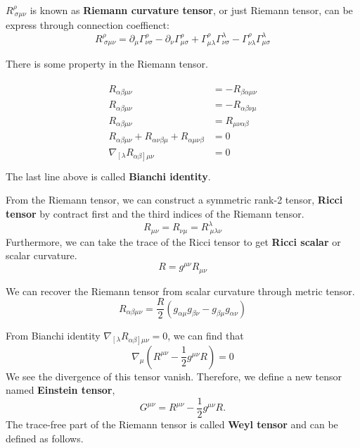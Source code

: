 \documentclass[12pt]{article}
\theoremstyle{mystyle}{\newtheorem{definition}{Definition}[subsection]}
\theoremstyle{mystyle}{\newtheorem{theorem}[definition]{Theorem}}
\theoremstyle{mystyle}{\newtheorem*{remark}{Remark}}
\theoremstyle{mystyle}{\newtheorem{example}{Example}[subsection]}
\theoremstyle{mystyle}{\newtheorem{examples}{Examples}[subsection]}
\theoremstyle{mystyle}{\newtheorem{cthm}{}[subsection]}
\begin{document}
\begin{definition}
  \(R^{\rho}_{\ \sigma\mu\nu}\) is known as \textbf{Riemann curvature tensor}, or just Riemann tensor,
  can be express through connection coeffienct: \[R^{\rho}_{\ \sigma\mu\nu} =
    \partial_{\mu} \Gamma^{\rho}_{\nu\sigma} -
    \partial_{\nu} \Gamma^{\rho}_{\mu\sigma} +
    \Gamma^{\rho}_{\mu\lambda}\Gamma^{\lambda}_{\nu\sigma} -
    \Gamma^{\rho}_{\nu\lambda}\Gamma^{\lambda}_{\mu\sigma}
  \]
\end{definition}
There is some property in the Riemann tensor.

\begin{cthm}
  \begin{align*}
    \begin{split}
      R_{\alpha\beta\mu\nu} &= -R_{\beta\alpha\mu\nu}\\
      R_{\alpha\beta\mu\nu} &= -R_{\alpha\beta\nu\mu}\\
      R_{\alpha\beta\mu\nu} &= R_{\mu\nu\alpha\beta}\\
      R_{\alpha\beta\mu\nu} + R_{\alpha\nu\beta\mu} + R_{\alpha\mu\nu\beta} &= 0 \\
      \nabla_{\left[ \lambda \right.} R_{\left.\alpha\beta \right] \mu\nu} &= 0 \\
    \end{split}
  \end{align*}
  The last line above is called \textbf{Bianchi identity}.
\end{cthm}

\begin{definition}
  From the Riemann tensor, we can construct a symmetric rank-2 tensor, \textbf{Ricci tensor}
  by contract first and the third indices of the Riemann tensor.
  \[R_{\mu\nu} = R_{\nu\mu} = R^{\lambda}_{\ \mu\lambda\nu}\]
  Furthermore, we can take the trace of the Ricci tensor to get \textbf{Ricci scalar} or scalar curvature.
  \[R = g^{\mu\nu}R_{\mu\nu}\]
\end{definition}

We can recover the Riemann tensor from scalar curvature through metric tensor.
\[R_{\alpha\beta\mu\nu} = \frac{R}{2}(g_{\alpha\mu}g_{\beta\nu}-g_{\beta\mu}g_{\alpha\nu})\]

From Bianchi identity \(\nabla_{\left[ \lambda \right.} R_{\left.\alpha\beta \right] \mu\nu} = 0\),
we can find that \[\nabla_{\mu}(R^{\mu\nu}-\frac{1}{2}g^{\mu\nu}R) = 0\]
We see the divergence of this tensor vanish. Therefore, we define a new tensor named \textbf{Einstein tensor},
\[G^{\mu\nu}=R^{\mu\nu}-\frac{1}{2}g^{\mu\nu}R. \]
The trace-free part of the Riemann tensor is called \textbf{Weyl tensor} and can be defined as follows.
\end{document}
